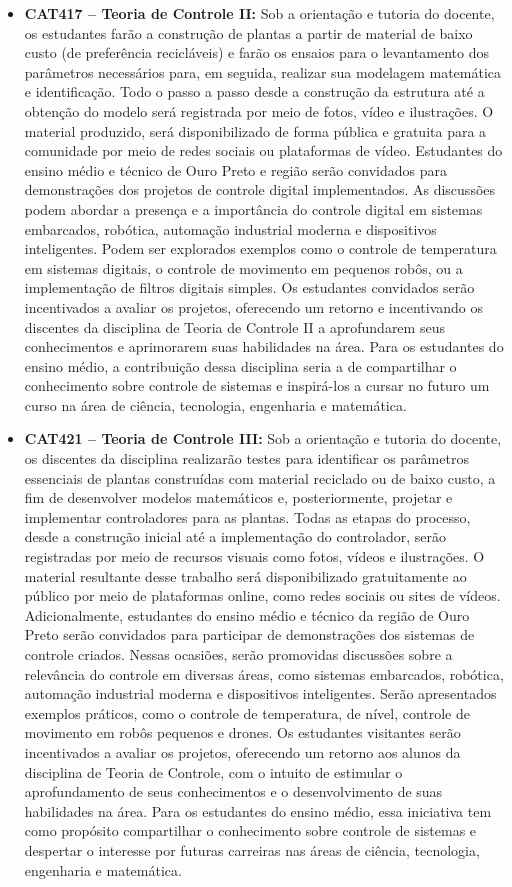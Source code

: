 \documentclass[
	12pt,				%
	openright,			%
	oneside,			%
	a4paper,			%
	english,			%
	brazil				%
	]{abntex2}
\begin{document}
\begin{itemize}
    \item \textbf{CAT417 -- Teoria de Controle II:} Sob a orientação e tutoria do docente, os estudantes farão a construção de plantas a partir de material de baixo custo (de preferência recicláveis) e farão os ensaios para o levantamento dos parâmetros necessários para, em seguida, realizar sua modelagem matemática e identificação. Todo o passo a passo desde a construção da estrutura até a obtenção do modelo será registrada por meio de fotos, vídeo e ilustrações. O material produzido, será disponibilizado de forma pública e gratuita para a comunidade por meio de redes sociais ou plataformas de vídeo. Estudantes do ensino médio e técnico de Ouro Preto e região serão convidados para demonstrações dos projetos de controle digital implementados. As discussões podem abordar a presença e a importância do controle digital em sistemas embarcados, robótica, automação industrial moderna e dispositivos inteligentes. Podem ser explorados exemplos como o controle de temperatura em sistemas digitais, o controle de movimento em pequenos robôs, ou a implementação de filtros digitais simples. Os estudantes convidados serão incentivados a avaliar os projetos, oferecendo um retorno e incentivando os discentes da disciplina de Teoria de Controle II a aprofundarem seus conhecimentos e aprimorarem suas habilidades na área. Para os estudantes do ensino médio, a contribuição dessa disciplina seria a de compartilhar o conhecimento sobre controle de sistemas e inspirá-los a cursar no futuro um curso na área de ciência, tecnologia, engenharia e matemática.

    \item \textbf{CAT421 -- Teoria de Controle III:} Sob a orientação e tutoria do docente, os discentes da disciplina realizarão testes para identificar os parâmetros essenciais de plantas construídas com material reciclado ou de baixo custo, a fim de desenvolver modelos matemáticos e, posteriormente, projetar e implementar controladores para as plantas. Todas as etapas do processo, desde a construção inicial até a implementação do controlador, serão registradas por meio de recursos visuais como fotos, vídeos e ilustrações. O material resultante desse trabalho será disponibilizado gratuitamente ao público por meio de plataformas online, como redes sociais ou sites de vídeos. Adicionalmente, estudantes do ensino médio e técnico da região de Ouro Preto serão convidados para participar de demonstrações dos sistemas de controle criados. Nessas ocasiões, serão promovidas discussões sobre a relevância do controle em diversas áreas, como sistemas embarcados, robótica, automação industrial moderna e dispositivos inteligentes. Serão apresentados exemplos práticos, como o controle de temperatura, de nível, controle de movimento em robôs pequenos e drones. Os estudantes visitantes serão incentivados a avaliar os projetos, oferecendo um retorno aos alunos da disciplina de Teoria de Controle, com o intuito de estimular o aprofundamento de seus conhecimentos e o desenvolvimento de suas habilidades na área. Para os estudantes do ensino médio, essa iniciativa tem como propósito compartilhar o conhecimento sobre controle de sistemas e despertar o interesse por futuras carreiras nas áreas de ciência, tecnologia, engenharia e matemática.


\end{itemize}
\end{document}
